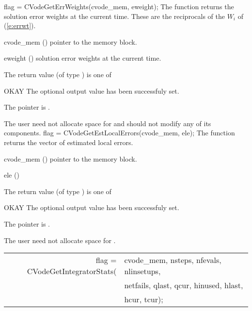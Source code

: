{}
{
  flag = CVodeGetErrWeights(cvode\_mem, eweight);
}
{
  The function  returns the solution error weights 
  at the current time. These are the reciprocals of the $W_i$ of (\ref{e:errwt}).
}
{
  \begin{args}
  \item[cvode\_mem] ()
    pointer to the {\cvode} memory block.
  \item[eweight] ()
    solution error weights at the current time.
  \end{args}
}
{
  The return value  (of type ) is one of
  \begin{args}
  \item[OKAY] 
    The optional output value has been successfuly set.
  \item[\Id{CVG\_NO\_MEM}]
    The  pointer is .
  \end{args}
}
{
  The user need not allocate space for  and should not modify
  any of its components.
}
{
  flag = CVodeGetEstLocalErrors(cvode\_mem, ele);
}
{
  The function  returns the
  vector of estimated local errors.
}
{
  \begin{args}
  \item[cvode\_mem] ()
    pointer to the {\cvode} memory block.
  \item[ele] ()
    
  \end{args}
}
{
  The return value  (of type ) is one of
  \begin{args}
  \item[OKAY] 
    The optional output value has been successfuly set.
  \item[\Id{CVG\_NO\_MEM}]
    The  pointer is .
  \end{args}
}
{
  The user need not allocate space for .
}
{
  \begin{tabular}[t]{@{}r@{}l@{}}
    flag = CVodeGetIntegratorStats(&cvode\_mem, nsteps, nfevals, nlinsetups, \\
                                   &netfails, qlast, qcur, hinused, hlast, \\
                                   &hcur, tcur);
  \end{tabular}
}
